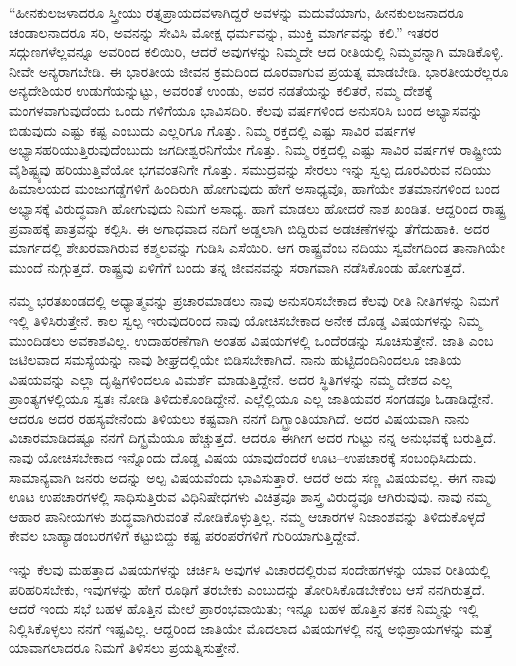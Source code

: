 “ಹೀನಕುಲಜಳಾದರೂ ಸ್ತ್ರೀಯು ರತ್ನಪ್ರಾಯದವಳಾಗಿದ್ದರೆ ಅವಳನ್ನು ಮದುವೆಯಾಗು, ಹೀನಕುಲಜನಾದರೂ ಚಂಡಾಲನಾದರೂ ಸರಿ, ಅವನನ್ನು ಸೇವಿಸಿ ಮೋಕ್ಷ ಧರ್ಮವನ್ನು, ಮುಕ್ತಿ ಮಾರ್ಗವನ್ನು ಕಲಿ.” ಇತರರ ಸದ್ಗುಣಗಳೆಲ್ಲವನ್ನೂ ಅವರಿಂದ ಕಲಿಯಿರಿ, ಆದರೆ ಅವುಗಳನ್ನು ನಿಮ್ಮದೇ ಆದ ರೀತಿಯಲ್ಲಿ ನಿಮ್ಮವನ್ನಾಗಿ ಮಾಡಿಕೊಳ್ಳಿ. ನೀವೇ ಅನ್ಯರಾಗಬೇಡಿ. ಈ ಭಾರತೀಯ ಜೀವನ ಕ್ರಮದಿಂದ ದೂರವಾಗುವ ಪ್ರಯತ್ನ ಮಾಡಬೇಡಿ. ಭಾರತೀಯರೆಲ್ಲರೂ ಅನ್ಯದೇಶಿಯರ ಉಡುಗೆಯನ್ನುಟ್ಟು, ಅವರಂತೆ ಉಂಡು, ಅವರ ನಡತೆಯನ್ನು ಕಲಿತರೆ, ನಮ್ಮ ದೇಶಕ್ಕೆ ಮಂಗಳವಾಗುವುದೆಂದು ಒಂದು ಗಳಿಗೆಯೂ ಭಾವಿಸದಿರಿ. ಕೆಲವು ವರ್ಷಗಳಿಂದ ಅನುಸರಿಸಿ ಬಂದ ಅಭ್ಯಾಸವನ್ನು ಬಿಡುವುದು ಎಷ್ಟು ಕಷ್ಟ ಎಂಬುದು ಎಲ್ಲರಿಗೂ ಗೊತ್ತು. ನಿಮ್ಮ ರಕ್ತದಲ್ಲಿ ಎಷ್ಟು ಸಾವಿರ ವರ್ಷಗಳ ಅಭ್ಯಾಸ\break ಹರಿಯುತ್ತಿರುವುದೆಂಬುದು ಜಗದೀಶ್ವರನಿಗೆಯೇ ಗೊತ್ತು. ನಿಮ್ಮ ರಕ್ತದಲ್ಲಿ ಎಷ್ಟು ಸಾವಿರ ವರ್ಷಗಳ ರಾಷ್ಟ್ರೀಯ ವೈಶಿಷ್ಟ್ಯವು ಹರಿಯುತ್ತಿವೆಯೋ ಭಗವಂತನಿಗೇ ಗೊತ್ತು. ಸಮುದ್ರವನ್ನು ಸೇರಲು ಇನ್ನು ಸ್ವಲ್ಪ ದೂರವಿರುವ ನದಿಯು ಹಿಮಾಲಯದ ಮಂಜುಗಡ್ಡೆಗಳಿಗೆ ಹಿಂದಿರುಗಿ ಹೋಗುವುದು ಹೇಗೆ ಅಸಾಧ್ಯವೊ, ಹಾಗೆಯೇ ಶತಮಾನಗಳಿಂದ ಬಂದ ಅಭ್ಯಾಸಕ್ಕೆ ವಿರುದ್ಧವಾಗಿ ಹೋಗುವುದು ನಿಮಗೆ ಅಸಾಧ್ಯ. ಹಾಗೆ ಮಾಡಲು ಹೋದರೆ ನಾಶ ಖಂಡಿತ. ಆದ್ದರಿಂದ ರಾಷ್ಟ್ರ ಪ್ರವಾಹಕ್ಕೆ ಪಾತ್ರವನ್ನು ಕಲ್ಪಿಸಿ. ಈ ಅಗಾಧವಾದ ನದಿಗೆ ಅಡ್ಡಲಾಗಿ ಬಿದ್ದಿರುವ ಅಡಚಣೆಗಳನ್ನು ತೆಗೆದುಹಾಕಿ. ಅದರ ಮಾರ್ಗದಲ್ಲಿ ಶೇಖರವಾಗಿರುವ ಕಶ್ಮಲವನ್ನು ಗುಡಿಸಿ ಎಸೆಯಿರಿ. ಆಗ ರಾಷ್ಟ್ರವೆಂಬ ನದಿಯು ಸ್ವವೇಗದಿಂದ ತಾನಾಗಿಯೇ ಮುಂದೆ ನುಗ್ಗುತ್ತದೆ. ರಾಷ್ಟ್ರವು ಏಳಿಗೆಗೆ ಬಂದು ತನ್ನ ಜೀವನವನ್ನು ಸರಾಗವಾಗಿ ನಡೆಸಿಕೊಂಡು ಹೋಗುತ್ತದೆ. 

ನಮ್ಮ ಭರತಖಂಡದಲ್ಲಿ ಅಧ್ಯಾತ್ಮವನ್ನು ಪ್ರಚಾರಮಾಡಲು ನಾವು ಅನುಸರಿಸಬೇಕಾದ ಕೆಲವು ರೀತಿ ನೀತಿಗಳನ್ನು ನಿಮಗೆ ಇಲ್ಲಿ ತಿಳಿಸಿರುತ್ತೇನೆ. ಕಾಲ ಸ್ವಲ್ಪ ಇರುವುದರಿಂದ ನಾವು ಯೋಚಿಸಬೇಕಾದ ಅನೇಕ ದೊಡ್ಡ ವಿಷಯಗಳನ್ನು ನಿಮ್ಮ ಮುಂದಿಡಲು ಅವಕಾಶವಿಲ್ಲ. ಉದಾಹರಣೆಗಾಗಿ ಅಂತಹ ವಿಷಯಗಳಲ್ಲಿ ಒಂದೆರಡನ್ನು ಸೂಚಿಸುತ್ತೇನೆ. ಜಾತಿ ಎಂಬ ಜಟಿಲವಾದ ಸಮಸ್ಯೆಯನ್ನು ನಾವು ಶೀಘ್ರದಲ್ಲಿಯೇ ಬಿಡಿಸಬೇಕಾಗಿದೆ. ನಾನು ಹುಟ್ಟಿದಂದಿನಿಂದಲೂ ಜಾತಿಯ ವಿಷಯವನ್ನು ಎಲ್ಲಾ ದೃಷ್ಟಿಗಳಿಂದಲೂ ವಿಮರ್ಶೆ ಮಾಡುತ್ತಿದ್ದೇನೆ. ಅದರ ಸ್ಥಿತಿಗಳನ್ನು ನಮ್ಮ ದೇಶದ ಎಲ್ಲ ಪ್ರಾಂತ್ಯಗಳಲ್ಲಿಯೂ ಸ್ವತಃ ನೋಡಿ ತಿಳಿದುಕೊಂಡಿದ್ದೇನೆ. ಎಲ್ಲೆಲ್ಲಿಯೂ ಎಲ್ಲ ಜಾತಿಯವರ ಸಂಗಡವೂ ಓಡಾಡಿದ್ದೇನೆ. ಆದರೂ ಅದರ ರಹಸ್ಯವೇನೆಂದು ತಿಳಿಯಲು ಕಷ್ಟವಾಗಿ ನನಗೆ ದಿಗ್ಭ್ರಾಂತಿಯಾಗಿದೆ. ಅದರ ವಿಷಯವಾಗಿ ನಾನು ವಿಚಾರಮಾಡಿದಷ್ಟೂ ನನಗೆ ದಿಗ್ಭ್ರಮೆಯೂ ಹೆಚ್ಚುತ್ತದೆ. ಆದರೂ ಈಗೀಗ ಅದರ ಗುಟ್ಟು ನನ್ನ ಅನುಭವಕ್ಕೆ ಬರುತ್ತಿದೆ. ನಾವು ಯೋಚಿಸಬೇಕಾದ ಇನ್ನೊಂದು ದೊಡ್ಡ ವಿಷಯ ಯಾವುದೆಂದರೆ ಊಟ–ಉಪಚಾರಕ್ಕೆ ಸಂಬಂಧಿಸಿದುದು. ಸಾಮಾನ್ಯವಾಗಿ ಜನರು ಅದನ್ನು ಅಲ್ಪ ವಿಷಯವೆಂದು ಭಾವಿಸುತ್ತಾರೆ. ಆದರೆ ಅದು ಸಣ್ಣ ವಿಷಯವಲ್ಲ. ಈಗ ನಾವು ಊಟ ಉಪಚಾರಗಳಲ್ಲಿ ಸಾಧಿಸುತ್ತಿರುವ ವಿಧಿನಿಷೇಧಗಳು ವಿಚಿತ್ರವೂ ಶಾಸ್ತ್ರ ವಿರುದ್ಧವೂ ಆಗಿರುವುವು. ನಾವು ನಮ್ಮ ಆಹಾರ ಪಾನೀಯಗಳು ಶುದ್ಧವಾಗಿರುವಂತೆ ನೋಡಿಕೊಳ್ಳುತ್ತಿಲ್ಲ. ನಮ್ಮ ಆಚಾರಗಳ ನಿಜಾಂಶವನ್ನು ತಿಳಿದುಕೊಳ್ಳದೆ ಕೇವಲ ಬಾಹ್ಯಾಡಂಬರಗಳಿಗೆ ಕಟ್ಟುಬಿದ್ದು ಕಷ್ಟ ಪರಂಪರೆಗಳಿಗೆ ಗುರಿಯಾಗುತ್ತಿದ್ದೇವೆ. 

ಇನ್ನು ಕೆಲವು ಮಹತ್ತಾದ ವಿಷಯಗಳನ್ನು ಚರ್ಚಿಸಿ ಅವುಗಳ ವಿಚಾರದಲ್ಲಿರುವ ಸಂದೇಹಗಳನ್ನು ಯಾವ ರೀತಿಯಲ್ಲಿ ಪರಿಹರಿಸಬೇಕು, ಇವುಗಳನ್ನು ಹೇಗೆ ರೂಢಿಗೆ ತರಬೇಕು ಎಂಬುದನ್ನು ತೋರಿಸಿಕೊಡಬೇಕೆಂಬ ಆಸೆ ನನಗಿರುತ್ತದೆ. ಆದರೆ ಇಂದು ಸಭೆ ಬಹಳ ಹೊತ್ತಿನ ಮೇಲೆ ಪ್ರಾರಂಭವಾಯಿತು; ಇನ್ನೂ ಬಹಳ ಹೊತ್ತಿನ ತನಕ ನಿಮ್ಮನ್ನು ಇಲ್ಲಿ ನಿಲ್ಲಿಸಿಕೊಳ್ಳಲು ನನಗೆ ಇಷ್ಟವಿಲ್ಲ. ಆದ್ದರಿಂದ ಜಾತಿಯೇ ಮೊದಲಾದ ವಿಷಯಗಳಲ್ಲಿ ನನ್ನ ಅಭಿಪ್ರಾಯಗಳನ್ನು ಮತ್ತೆ ಯಾವಾಗಲಾದರೂ ನಿಮಗೆ ತಿಳಿಸಲು ಪ್ರಯತ್ನಿಸುತ್ತೇನೆ. 

